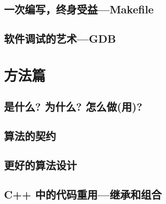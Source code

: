\documentclass[a4paper,oneside]{report}
\begin{document}
\begin{CJK*}{UTF8}{gkai}
\section{一次编写，终身受益---Makefile}
\label{sec:make}


\section{软件调试的艺术---GDB}
\label{sec:gdb}




\chapter{方法篇}

\section{是什么? 为什么? 怎么做(用)?}
\label{sec:WhatWhyHow}


\section{算法的契约}
\label{sec:contract}


\section{更好的算法设计}
\label{sec:designAlgo}


\section{C++ 中的代码重用---继承和组合}
\label{sec:reuse}


 
{\footnotesize


}



\end{CJK*}
\end{document}
